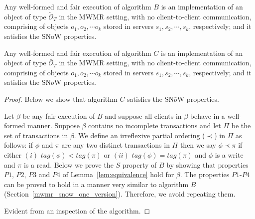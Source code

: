       
\begin{theorem} Any well-formed  and fair execution of algorithm $B$ is an implementation of  an object of type $\tilde{\mathcal{O}}_T$ in the MWMR setting, 
  with no client-to-client communication,  comprising of objects $o_1, o_2, \cdots o_k$ stored in servers $s_1, s_2, \cdots, s_k$, respectively; and it satisfies the SNoW  properties. %
  \end{theorem}

\begin{theorem} Any well-formed  and fair execution of algorithm $C$ is an implementation of  an object of type $\bar{\mathcal{O}}_T$ in the MWMR setting, 
  with no client-to-client communication,  comprising of objects $o_1, o_2, \cdots o_k$ stored in servers $s_1, s_2, \cdots, s_k$, respectively; and it satisfies the SN$\bar{o}$W  properties. %
\end{theorem}

\begin{proof} Below we show that algorithm $C$ satisfies the  SN$\bar{o}$W properties. 
  
  Let $\beta$ be any fair execution  of  $B$ and 
 suppose all clients in $\beta$ behave in a well-formed
manner. Suppose $\beta$ contains no incomplete transactions and let  $\Pi$ be the set of transactions in $\beta$.  We define an irreflexive partial ordering ($\prec$) in $\Pi$ as follows:  if $\phi$ and $\pi$ are any two distinct transactions in $\Pi$ then we say 
  $\phi \prec \pi$ if either $(i)$ $tag(\phi) < tag(\pi)$ or $(ii)$ $tag(\phi) = tag(\pi)$ and $\phi$ is a {\sc write} and $\pi$ is a {\sc read}. Below we prove the $S$  property of $B$ by showing that  properties $P1$, $P2$, $P3$ and $P4$ of Lemma~\ref{lem:equivalence} hold for $\beta$.  The properties $P1$-$P4$ can be proved to hold in a manner very similar to algorithm $B$ (Section~\ref{mwmr_snow_one_version}). Therefore, we avoid repeating them. 

    Evident from an inspection of the algorithm.
  \end{proof}


